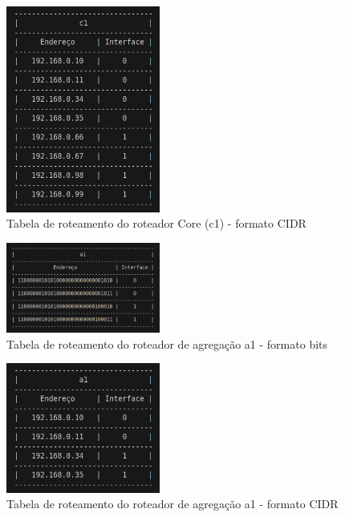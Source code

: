 \documentclass[conference,compsoc]{IEEEtran}
\begin{document}
\begin{otherlanguage}{brazil}
\begin{figure}[h]
\centering
\includegraphics[width=0.45\textwidth]{../media/cidr c1.png}
\caption{Tabela de roteamento do roteador Core (c1) - formato CIDR}
\end{figure}

\begin{figure}[h]
\centering
\includegraphics[width=0.45\textwidth]{../media/bits a1.png}
\caption{Tabela de roteamento do roteador de agregação a1 - formato bits}
\end{figure}

\clearpage

\begin{figure}[h]
\centering
\includegraphics[width=0.45\textwidth]{../media/cidr a1.png}
\caption{Tabela de roteamento do roteador de agregação a1 - formato CIDR}
\end{figure}


\end{otherlanguage}
\end{document}
